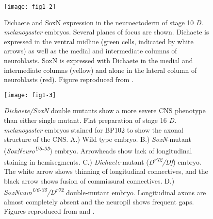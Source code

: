 \begin{figure}
\centering
\texttt{[image: fig1-2]}
\caption[Dichaete and SoxN expression in stage 10 \emph{D. melanogaster} embryos]{Dichaete and SoxN expression in the neuroectoderm of stage 10 \emph{D. melanogaster} embryos. Several planes of focus are shown. Dichaete is expressed in the ventral midline (green cells, indicated by white arrows) as well as the medial and intermediate columns of neuroblasts. SoxN is expressed with Dichaete in the medial and intermediate columns (yellow) and alone in the lateral column of neuroblasts (red). Figure reproduced from \citet{overton_phd}.}
\label{Figure 1.2}
\end{figure} 

\begin{figure}
\centering
\texttt{[image: fig1-3]}
\caption[\emph{Dichaete/SoxN} double mutants show a more severe CNS phenotype than either single mutant]{\emph{Dichaete/SoxN} double mutants show a more severe CNS phenotype than either single mutant. Flat preparation of stage 16 \emph{D. melanogaster} embryos stained for BP102 to show the axonal structure of the CNS. A.) Wild type embryo. B.) \emph{SoxN}-mutant (\emph{SoxNeuro\textsuperscript{U6-35}}) embryo. Arrowheads show lack of longitudinal staining in hemisegments. C.) \emph{Dichaete}-mutant (\emph{D\textsuperscript{r72}/Df}) embryo. The white arrow shows thinning of longitudinal connectives, and the black arrow shows fusion of commissural connectives. D.) \emph{SoxNeuro\textsuperscript{U6-35}/D\textsuperscript{r72}} double-mutant embryo. Longitudinal axons are almost completely absent and the neuropil shows frequent gaps. Figures reproduced from \citet{overton_evidence_2002} and \citet{soriano_drosophila_1998}.}
\label{Figure 1.3}
\end{figure}


